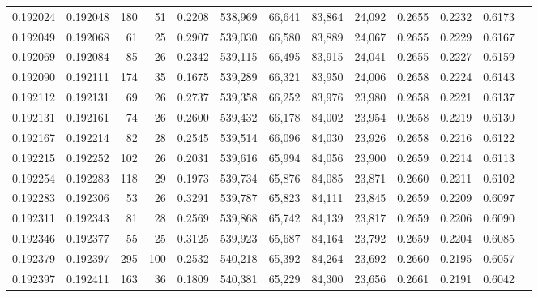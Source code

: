 \begin{tabular}{rrrrrrrrrrrrr}
0.192024 & 0.192048 &   180 &  51 &                                     0.2208 & 538,969 &  66,641 &  83,864 &  24,092 & 0.2655 & 0.2232 & 0.6173 \\
0.192049 & 0.192068 &    61 &  25 &                                     0.2907 & 539,030 &  66,580 &  83,889 &  24,067 & 0.2655 & 0.2229 & 0.6167 \\
0.192069 & 0.192084 &    85 &  26 &                                     0.2342 & 539,115 &  66,495 &  83,915 &  24,041 & 0.2655 & 0.2227 & 0.6159 \\
0.192090 & 0.192111 &   174 &  35 &                                     0.1675 & 539,289 &  66,321 &  83,950 &  24,006 & 0.2658 & 0.2224 & 0.6143 \\
0.192112 & 0.192131 &    69 &  26 &                                     0.2737 & 539,358 &  66,252 &  83,976 &  23,980 & 0.2658 & 0.2221 & 0.6137 \\
0.192131 & 0.192161 &    74 &  26 &                                     0.2600 & 539,432 &  66,178 &  84,002 &  23,954 & 0.2658 & 0.2219 & 0.6130 \\
0.192167 & 0.192214 &    82 &  28 &                                     0.2545 & 539,514 &  66,096 &  84,030 &  23,926 & 0.2658 & 0.2216 & 0.6122 \\
0.192215 & 0.192252 &   102 &  26 &                                     0.2031 & 539,616 &  65,994 &  84,056 &  23,900 & 0.2659 & 0.2214 & 0.6113 \\
0.192254 & 0.192283 &   118 &  29 &                                     0.1973 & 539,734 &  65,876 &  84,085 &  23,871 & 0.2660 & 0.2211 & 0.6102 \\
0.192283 & 0.192306 &    53 &  26 &                                     0.3291 & 539,787 &  65,823 &  84,111 &  23,845 & 0.2659 & 0.2209 & 0.6097 \\
0.192311 & 0.192343 &    81 &  28 &                                     0.2569 & 539,868 &  65,742 &  84,139 &  23,817 & 0.2659 & 0.2206 & 0.6090 \\
0.192346 & 0.192377 &    55 &  25 &                                     0.3125 & 539,923 &  65,687 &  84,164 &  23,792 & 0.2659 & 0.2204 & 0.6085 \\
0.192379 & 0.192397 &   295 & 100 &                                     0.2532 & 540,218 &  65,392 &  84,264 &  23,692 & 0.2660 & 0.2195 & 0.6057 \\
0.192397 & 0.192411 &   163 &  36 &                                     0.1809 & 540,381 &  65,229 &  84,300 &  23,656 & 0.2661 & 0.2191 & 0.6042 \\

\end{tabular}
